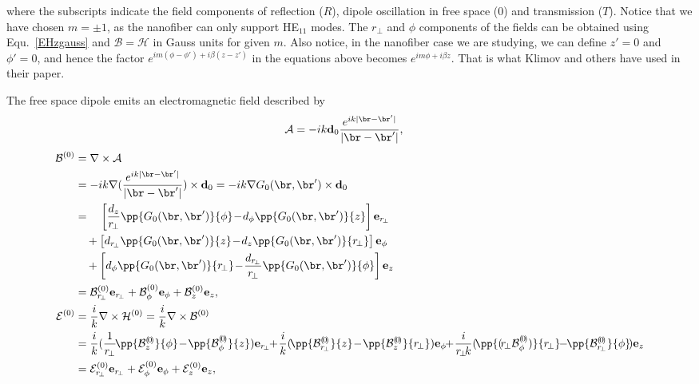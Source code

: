 \documentclass[]{report}
\begin{document}
where the subscripts indicate the field components of reflection ($R$), dipole oscillation in free space ($0$) and transmission ($ T $). Notice that we have chosen $ m=\pm 1 $, as the nanofiber can only support HE$_{11}$ modes. 
The $ r\!_\perp $ and $ \phi $ components of the fields can be obtained using Equ.~\eqref{EHzgauss} and $ \mathcal{B}=\mathcal{H} $ in Gauss units for given $ m $. Also notice, in the nanofiber case we are studying, we can define $ z'=0 $ and $ \phi'=0 $, and hence the factor $ e^{im(\phi-\phi') + i\beta (z-z')} $ in the equations above becomes $ e^{im\phi + i\beta z} $. That is what Klimov and others have used in their paper.

The free space dipole emits an electromagnetic field described by
\begin{align}
\mathcal{A} &= -ik \mathbf{d}_0 \frac{e^{ik|\br-\br'|}}{|\br-\br'|},
\end{align}
\begin{align}
\mathcal{B}^{(0)} &= \nabla\times \mathcal{A}\nonumber \\
&=-ik\nabla(\frac{e^{ik|\br-\br'|}}{|\br-\br'|})\times\mathbf{d}_0=-ik\nabla G_0(\br,\br')\times\mathbf{d}_0\nonumber\\
&=\quad\left[\frac{d_z}{r\!_\perp}\pp{G_0(\br,\br')}{\phi}\!-\! d_\phi\pp{G_0(\br,\br')}{z}\right]\mathbf{e}_{r\!_{\perp}}\nonumber\\
&\quad+\left[d_{r\!_\perp}\pp{G_0(\br,\br')}{z}\!-\!d_z\pp{G_0(\br,\br')}{r\!_\perp} \right]\mathbf{e}_\phi \nonumber\\
&\quad+ \left[d_\phi\pp{G_0(\br,\br')}{r\!_\perp}\!-\! \frac{d_{r\!_\perp}}{r\!_\perp}\pp{G_0(\br,\br')}{\phi} \right]\mathbf{e}_z\\
&=\mathcal{B}^{(0)}_{r\!_\perp}\mathbf{e}_{r\!_{\perp}} +\mathcal{B}^{(0)}_\phi\mathbf{e}_\phi + \mathcal{B}^{(0)}_z\mathbf{e}_z,\\
\mathcal{E}^{(0)} &= \frac{i}{k} \nabla\times \mathcal{H}^{(0)}=\frac{i}{k}\nabla\times \mathcal{B}^{(0)}\nonumber\\
&=\frac{i}{k}(\frac{1}{r\!_\perp}\!\pp{\mathcal{B}^{(\!0\!)}_z}{\phi}\!-\! \pp{\mathcal{B}^{(\!0\!)}_\phi}{z})\mathbf{e}_{r\!_{\perp}} \!\!+\! \frac{i}{k}(\!\pp{\mathcal{B}^{(\!0\!)}_{r\!_\perp}}{z} \!-\! \pp{\mathcal{B}^{(\!0\!)}_z}{r\!_\perp})\mathbf{e}_\phi \!\!+\! \frac{i}{r\!_\perp\! k} (\!\pp{(\! r\!_\perp \mathcal{B}^{(\!0\!)}_\phi)}{r\!_\perp} \!\!-\!\! \pp{\mathcal{B}^{(\!0\!)}_{r\!_\perp}}{\phi}\! )\mathbf{e}_z\\
&=\mathcal{E}^{(0)}_{r\!_\perp}\mathbf{e}_{r\!_{\perp}} +\mathcal{E}^{(0)}_\phi\mathbf{e}_\phi + \mathcal{E}^{(0)}_z\mathbf{e}_z,
\end{align}
\end{document}
